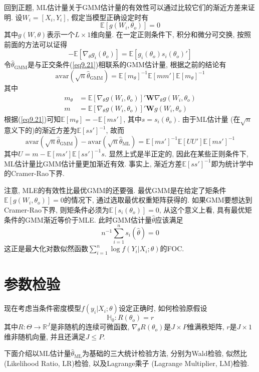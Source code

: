 \documentclass[cn, 12pt, math=mtpro2, bibstyle=apa, blue, twocol]{elegantbook}
\newcommand{\R}{\mathbb{R}}
\newcommand{\E}{\mathbb{E}}
\newcommand{\W}{\mathbold{W}}
\newcommand{\HH}{\mathbb{H}}
\newcommand{\hth}{\hat{\theta}}
\begin{document}
回到正题, ML估计量关于GMM估计量的有效性可以通过比较它们的渐近方差来证明. 设$W_i=[X_i,Y_i]$, 假定当模型正确设定时有
\begin{equation}\label{eq9.21}
  \E[g(W_i,\theta_o)]=0
\end{equation}
其中$g(W,\theta)$表示一个$L\times 1$维向量. 在一定正则条件下, 积分和微分可交换, 按照前面的方法可以证得
\begin{equation}\label{eq9.22}
  -\E[\nabla_\theta g_i(\theta_o)]=\E[g_i(\theta_o)s_i(\theta_o)']
\end{equation}
令$\hth_{\text{GMM}}$是与正交条件(\ref{eq9.21})相联系的GMM估计量, 根据之前的结论有
$$\text{avar}(\sqrt{n}\hth_\text{GMM})=\E[m_\theta]^{-1}\E[mm']\E[m_\theta]^{-1}$$
其中
\begin{align*}
m_\theta&=\E[\nabla_\theta g(W_i,\theta_o)]'\W \nabla_\theta g(W_i,\theta_o) \\
m&=\E[\nabla_\theta g(W_i,\theta_o)]'\W g(W_i,\theta_o)
\end{align*}
根据(\ref{eq9.21})可知$\E[m_\theta]=-\E[ms']$, 其中$s=s_i(\theta_o)$. 由于ML估计量 (在$\sqrt{n}$意义下的)的渐近方差为$\E[ss']^{-1}$, 故而
$$\text{avar}(\sqrt{n}\hth_\text{GMM})-\text{avar}(\sqrt{n}\hth_\text{ML})=\E[ms']^{-1}\E[UU']\E[ms']^{-1}$$
其中$U=m-\E[ms']\E[ss']^{-1}s$. 显然上式是半正定的, 因此在某些正则条件下, ML估计量比GMM估计量更加渐近有效. 事实上, 渐近方差$\E[ss']^{-1}$即为统计学中的Cramer-Rao下界.

注意, MLE的有效性比最优GMM的还要强. 最优GMM是在给定了矩条件$\E[g(W_i,\theta_o)]=0$的情况下, 通过选取最优权重矩阵获得的. 如果GMM要想达到Cramer-Rao下界, 则矩条件必须为$\E[s_i(\theta_o)]=0$, 从这个意义上看, 具有最优矩条件的GMM渐近等价于MLE. 此时GMM估计量$\hth$应该满足
$$n^{-1}\sum_{i=1}^{n}s_i(\hth)=0$$
这正是最大化对数似然函数$\sum_{i=1}^{n}\log f(Y_i|X_i;\theta)$的FOC.


\section{参数检验}
现在考虑当条件密度模型$f(y_i|X_i;\theta)$设定正确时, 如何检验原假设
$$\HH_0: R(\theta_o)=r$$
其中$R:\Theta \to \R^J$是非随机的连续可微函数, $\nabla_\theta R(\theta_o)$是$J\times P$维满秩矩阵, $r$是$J\times 1$维非随机向量, 并且还满足$J\leq P$.

下面介绍以ML估计量$\hth_{\text{ML}}$为基础的三大统计检验方法, 分别为Wald检验, 似然比 (Likelihood Ratio, LR)检验, 以及Lagrange乘子 (Lagrange Multiplier, LM)检验.
\end{document}
